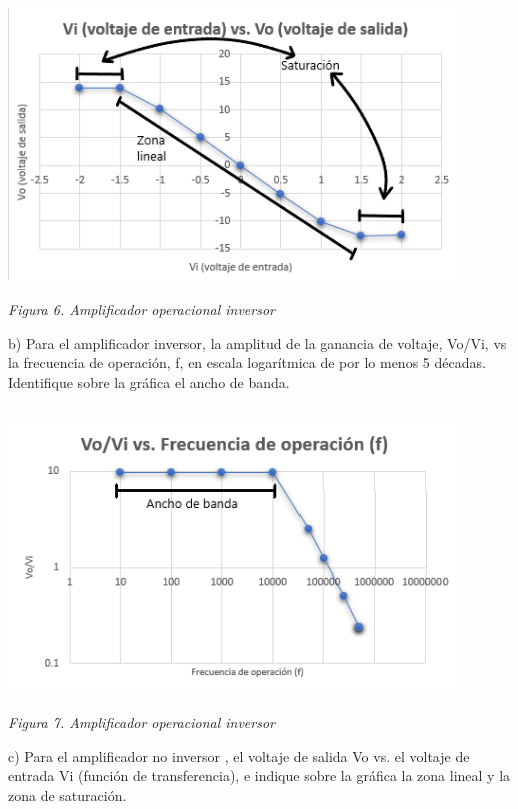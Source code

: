 \documentclass[12pt]{article}
\begin{document}
	\begin{center}
		\includegraphics[width=12cm,height=8cm]{Img/graf1}\\
		\textit{Figura 6. Amplificador operacional inversor}\\
	\end{center}
	
	b) Para el amplificador inversor, la amplitud de la ganancia de voltaje, Vo/Vi, vs la frecuencia de operación, f, en escala logarítmica de por lo menos 5 décadas. Identifique sobre la gráfica el ancho de banda.\\
	
	\begin{center}
		\includegraphics[width=12cm,height=8cm]{Img/graf2}\\
		\textit{Figura 7. Amplificador operacional inversor}\\
	\end{center}
	
	\vspace{3cm}
	c) Para el amplificador no inversor , el voltaje de salida Vo vs. el voltaje de entrada Vi (función de transferencia), e indique sobre la gráfica la zona lineal y la zona de saturación.\\
	
\end{document}
